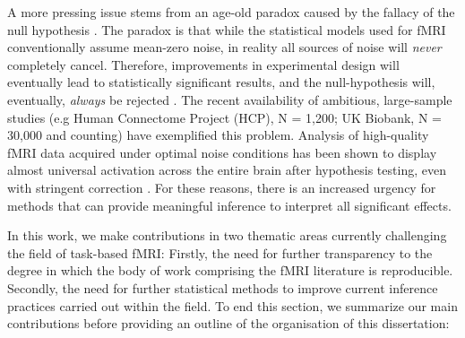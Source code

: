 A more pressing issue stems from an age-old paradox caused by the fallacy of the null hypothesis \citep{Rozeboom1960-dp}. The paradox is that while the statistical models used for fMRI conventionally assume mean-zero noise, in reality all sources of noise will \textit{never} completely cancel. Therefore, improvements in experimental design will eventually lead to statistically significant results, and the null-hypothesis will, eventually, \textit{always} be rejected \citep{Meehl1967-ij}. The recent availability of ambitious, large-sample studies (e.g Human Connectome Project (HCP), N = 1,200; UK Biobank, N = 30,000 and counting) have exemplified this problem. Analysis of high-quality fMRI data acquired under optimal noise conditions has been shown to display almost universal activation across the entire brain after hypothesis testing, even with stringent correction \citep{Gonzalez-Castillo2012-do}. For these reasons, there is an increased urgency for methods that can provide meaningful inference to interpret all significant effects. 

\bigskip

\noindent In this work, we make contributions in two thematic areas currently challenging the field of task-based fMRI: Firstly, the need for further transparency to the degree in which the body of work comprising the fMRI literature is reproducible. Secondly, the need for further statistical methods to improve current inference practices carried out within the field. To end this section, we summarize our main contributions before providing an outline of the organisation of this dissertation: 

